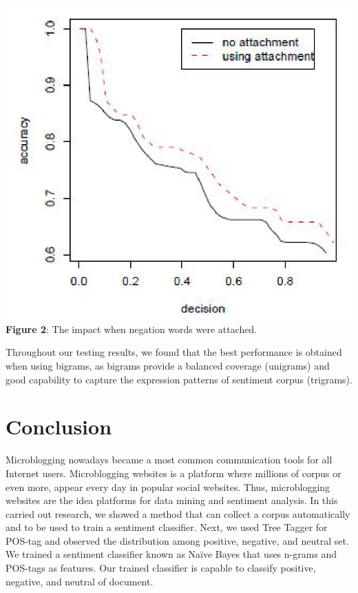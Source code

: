 \documentclass[a4paper,12pt]{article}
\begin{document}
\begin{center}
\includegraphics[scale=0.5]{graphs.eps}
\linebreak
\linebreak
\textbf{Figure 2}: The impact when negation words were attached.
\end{center}

Throughout our testing results, we found that the best performance is obtained when using bigrams, as bigrams provide a balanced coverage (unigrams) and good capability to capture the expression patterns of sentiment corpus (trigrams).

\section*{\textbf{Conclusion}}
Microblogging nowadays became a most common communication tools for all Internet users. Microblogging websites is a platform where millions of corpus or even more, appear every day in popular social websites. Thus, microblogging websites are the idea platforms for data mining and sentiment analysis. In this carried out research, we showed a method that can collect a corpus automatically and to be used to train a sentiment classifier. Next, we used Tree Tagger for POS-tag and observed the distribution among positive, negative, and neutral set. We trained a sentiment classifier known as Naïve Bayes that uses n-grams and POS-tags as features. Our trained classifier is capable to classify positive, negative, and neutral of document. 
\end{document}
